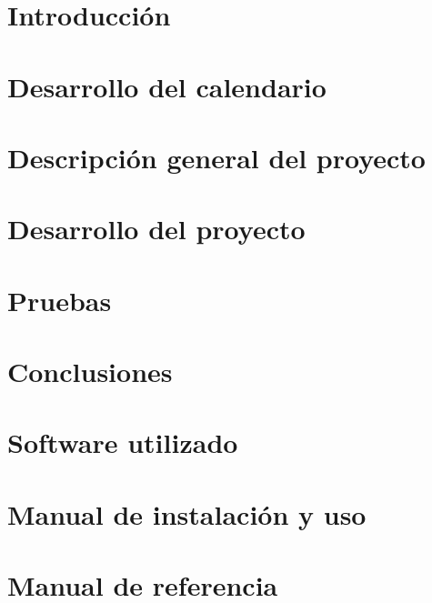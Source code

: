 \documentclass[a4paper,11pt,oneside]{book}
\begin{document}
\pagestyle{empty}

\cleardoublepage


\cleardoublepage

\fontsize{12}{15}
\selectfont

\frontmatter %


\clearpage

\pagestyle{fancy}
\fancyhead{}
\fancyfoot{}
\setlength{\headheight}{15pt}
\renewcommand{\headrulewidth}{0.5pt}
\renewcommand{\footrulewidth}{0pt}
\fancyhead[LE,LO]{\slshape \leftmark}
\fancyhead[RE,RO]{\thepage}
\setlength\headsep{15pt}

\tableofcontents
\listoffigures
\listoftables

\mainmatter %

\chapter{Introducción}


\chapter{Desarrollo del calendario}


\chapter{Descripción general del proyecto}


\chapter{Desarrollo del proyecto}


\chapter{Pruebas}


\chapter{Conclusiones}





\appendix %

\chapter{Software utilizado}


\chapter{Manual de instalación y uso}


\chapter{Manual de referencia}



\end{document}
